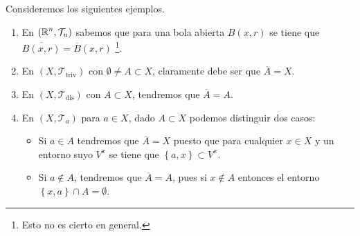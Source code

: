 \begin{eg}
Consideremos los siguientes ejemplos.
\begin{enumerate}
\item En $\displaystyle \left(\mathbb{R}^{n}, \mathcal{T}_{u}\right) $ sabemos que para una bola abierta $\displaystyle B\left(x, r\right) $ se tiene que $\displaystyle \overline{B\left(x,r\right)}=\overline{B}\left(x,r\right) $ \footnote{Esto no es cierto en general.}.
\item En $\displaystyle \left(X, \mathcal{T}_{\text{triv}}\right) $ con $\displaystyle \emptyset \neq A \subset X $, claramente debe ser que $\displaystyle \overline{A}=X $.
\item En $\displaystyle \left(X, \mathcal{T}_{\text{dis}}\right) $ con $\displaystyle A\subset X $, tendremos que $\displaystyle \overline{A}= A $.
\item En $\displaystyle \left(X, \mathcal{T}_{a}\right) $ para $\displaystyle a \in X $, dado $\displaystyle A \subset X $ podemos distinguir dos casos:
	\begin{itemize}
		\item Si $\displaystyle a \in A $ tendremos que $\displaystyle \overline{A}= X $ puesto que para cualquier $\displaystyle x \in X $ y un entorno suyo $\displaystyle V^{x} $ se tiene que $\displaystyle \left\{ a,x\right\} \subset V^{x} $.
		\item Si $\displaystyle a \not\in A $, tendremos que $\displaystyle \overline{A}= A $, pues si $\displaystyle x \not\in A $ entonces el entorno $\displaystyle \left\{ x,a\right\} \cap A = \emptyset $. 
	\end{itemize}
\end{enumerate}
\end{eg}

